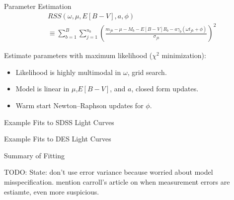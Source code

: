 \documentclass[12pt]{beamer}
\newcommand{\todo}[1]{{\color{red}TODO: #1}}
\begin{document}
\begin{frame}{Parameter Estimation}
\begin{align*}
&RSS(\omega,\mu,E[B-V],a,\phi) \\
 &\equiv\sum_{b=1}^B \sum_{j=1}^{n_b}\left(\frac{m_{jb} - \mu - M_b - E[B-V]R_b - a\gamma_b(\omega t_{jb} + \phi)}{\sigma_{jb}}\right)^2
\end{align*}


Estimate parameters with maximum likelihood ($\chi^2$ minimization):
\begin{itemize}
\item Likelihood is highly multimodal in $\omega$, grid search.
\item Model is linear in $\mu$,$E[B-V]$, and $a$, closed form updates.
\item Warm start Newton--Raphson updates for $\phi$.
\end{itemize}

\end{frame}

\begin{frame}{Example Fits to SDSS Light Curves}

\end{frame}

\begin{frame}{Example Fits to DES Light Curves}

\end{frame}

\begin{frame}{Summary of Fitting}

  \todo{State: don't use error variance because worried about model misspecification. mention carroll's article on when measurement errors are estiamte, even more suspicious.} 
  
\end{frame}
\end{document}
